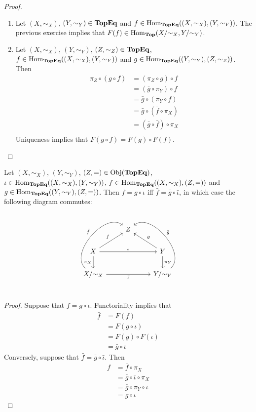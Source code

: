 \documentclass{book}
\begin{document}
	\begin{proof}\
		\begin{enumerate}
			\item Let $(X, \sim_X)$, $(Y, \sim_Y) \in \operatorname*{\text{\textbf{TopEq}}}$ and $f \in \operatorname{Hom}_{\operatorname*{\text{\textbf{TopEq}}}}((X, \sim_X), (Y, \sim_Y))$. The previous exercise implies that $F(f) \in \operatorname{Hom}_{\operatorname*{\text{\textbf{Top}}}}(X/{\sim_X}, Y/ {\sim_Y})$. 
			\item  Let $(X, \sim_X)$, $(Y, \sim_Y)$, $(Z, \sim_Z) \in \operatorname*{\text{\textbf{TopEq}}}$,  $f \in \operatorname{Hom}_{\operatorname*{\text{\textbf{TopEq}}}}((X, \sim_X), (Y, \sim_Y))$ and $g \in \operatorname{Hom}_{\operatorname*{\text{\textbf{TopEq}}}}((Y, \sim_Y), (Z, \sim_Z))$. Then 
			\begin{align*}
				\pi_Z \circ (g \circ f)
				& = (\pi_Z \circ g) \circ f \\
				& = (\bar{g} \circ \pi_Y) \circ f \\
				& = \bar{g} \circ (\pi_Y \circ f) \\
				& = \bar{g} \circ (\bar{f} \circ \pi_X) \\
				& = (\bar{g} \circ \bar{f}) \circ \pi_X \\
			\end{align*}
			Uniqueness implies that $F(g \circ f) = F(g) \circ F(f)$. 
		\end{enumerate}
	\end{proof}

	\begin{ex}  
		Let $(X, \sim_X)$, $(Y, \sim_Y)$, $(Z, =)  \in \operatorname{Obj}(\operatorname*{\text{\textbf{TopEq}}})$, $\iota \in \operatorname{Hom}_{\operatorname*{\text{\textbf{TopEq}}}}((X, \sim_X), (Y, \sim_Y))$,  $ f \in \operatorname{Hom}_{\operatorname*{\text{\textbf{TopEq}}}}((X, \sim_X), (Z, =))$ and  $ g \in \operatorname{Hom}_{\operatorname*{\text{\textbf{TopEq}}}}((Y, \sim_Y), (Z, =))$. 
		Then $f = g \circ \iota $ iff $\bar{f} = \bar{g} \circ \bar{\iota}$, in which case the following diagram commutes: 
		\[ 
		\begin{tikzcd}
			& Z & \\
			X  \arrow[rr, "\iota"]  \arrow[d, "\pi_X"'] \arrow[ur, "f"] & & Y   \arrow[d, "\pi_Y"] \arrow[ul, "g"']\\
			X/ {\sim_X} \arrow[bend left=90]{uur}{\bar{f}} \arrow[rr, "\bar{\iota}"'] & &  Y / {\sim_Y} \arrow[bend right=90, swap]{uul}{\bar{g}} \\
		\end{tikzcd}
		\]
	\end{ex}

	\begin{proof}
		Suppose that $f = g \circ \iota$. Functoriality implies that 
		\begin{align*}
			\bar{f} 
			& = F(f) \\
			& = F(g \circ \iota) \\
			& = F(g) \circ F(\iota) \\
			&= \bar{g} \circ \bar{\iota}
		\end{align*}
		Conversely, suppose that $\bar{f} = \bar{g} \circ \bar{\iota}$. Then
		\begin{align*}
			f
			& = \bar{f} \circ \pi_X \\
			& = \bar{g} \circ \bar{\iota} \circ \pi_X \\
			& = \bar{g} \circ \pi_Y \circ \iota \\
			& = g \circ \iota 
		\end{align*}
	\end{proof}
	
\end{document}

